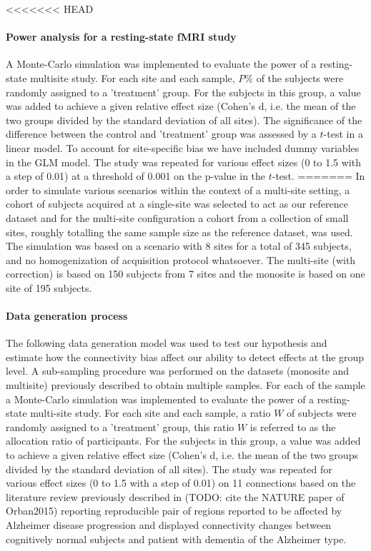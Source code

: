\documentclass[authoryear]{elsarticle}
\begin{document}
<<<<<<< HEAD
\paragraph{Power analysis for a resting-state fMRI study}
A Monte-Carlo simulation was implemented to evaluate the power of a resting-state multisite study. For each site and each sample, $P\%$ of the subjects were randomly assigned to a 'treatment' group. For the subjects in this group, a value was added to achieve a given relative effect size (Cohen's d, i.e. the mean of the two groups divided by the standard deviation of all sites). The significance of the difference between the control and 'treatment' group was assessed by a $t$-test in a linear model. To account for site-specific bias we have included dummy variables in the GLM model. The study was repeated for various effect sizes (0 to 1.5 with a step of 0.01) at a threshold of 0.001 on the p-value in the $t$-test.
=======
In order to simulate various scenarios within the context of a multi-site setting, a cohort of subjects acquired at a single-site was selected to act as our reference dataset and for the multi-site configuration a cohort from a collection of small sites, roughly totalling the same sample size as the reference dataset, was used. The simulation was based on a scenario with 8 sites for a total of 345 subjects, and no homogenization of acquisition protocol whatsoever. The multi-site (with correction) is based on 150 subjects from 7 sites and the monosite is based on one site of 195 subjects.  

\paragraph{Data generation process}
The following data generation model was used to test our hypothesis and estimate how the connectivity bias affect our ability to detect effects at the group level.
A sub-sampling procedure was performed on the datasets (monosite and multisite) previously described to obtain multiple samples. For each of the sample a Monte-Carlo simulation was implemented to evaluate the power of a resting-state multi-site study. For each site and each sample, a ratio $W$ of subjects were randomly assigned to a 'treatment' group, this ratio $W$ is referred to as the allocation ratio of participants. For the subjects in this group, a value was added to achieve a given relative effect size (Cohen's d, i.e. the mean of the two groups divided by the standard deviation of all sites). The study was repeated for various effect sizes (0 to 1.5 with a step of 0.01) on 11 connections based on the literature review previously described in (TODO: cite the NATURE paper of Orban2015) reporting reproducible pair of regions reported to be affected by Alzheimer disease progression and displayed connectivity changes between cognitively normal subjects and patient with dementia of the Alzheimer type.
\end{document}
